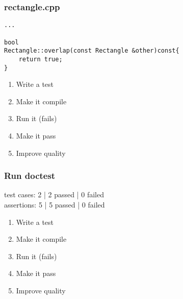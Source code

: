 \begin{frame}[fragile]
\frametitle{rectangle.cpp}
\begin{minipage}[t]{0.48\linewidth}
\begin{lstlisting}
...

bool 
Rectangle::overlap(const Rectangle &other)const{
    return true;
}
\end{lstlisting}
\end{minipage}\hfill
\begin{minipage}[t]{0.28\linewidth}
  \small
  \begin{enumerate} 
    \item \textcolor{deadcolor}{Write a test}
    \item \textcolor{deadcolor}{Make it compile}
    \item \textcolor{deadcolor}{Run it (fails)}
    \item \textcolor{activecolor}{Make it pass}
    \item \textcolor{deadcolor}{Improve quality}
  \end{enumerate} 
\end{minipage}
\end{frame}

\begin{frame}[fragile]
\frametitle{Run doctest}
\begin{minipage}[t]{0.48\linewidth}
test cases: 2 | 2 passed | 0 failed\\
assertions: 5 | 5 passed | 0 failed\\
\end{minipage}\hfill
\begin{minipage}[t]{0.28\linewidth}
  \small
  \begin{enumerate} 
    \item \textcolor{deadcolor}{Write a test}
    \item \textcolor{deadcolor}{Make it compile}
    \item \textcolor{deadcolor}{Run it (fails)}
    \item \textcolor{activecolor}{Make it pass}
    \item \textcolor{deadcolor}{Improve quality}
  \end{enumerate} 
\end{minipage}
\end{frame}

